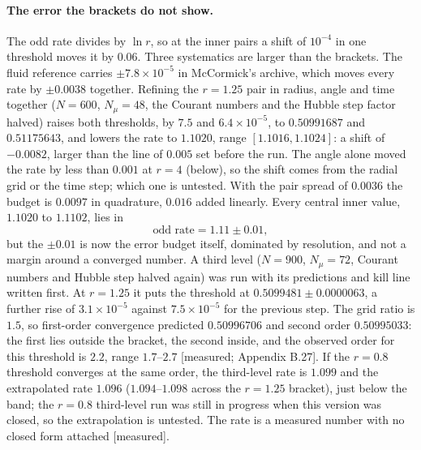 \documentclass[11pt]{article}
\newcommand{\grade}[1]{\textsf{\small[#1]}}
\begin{document}
\paragraph{The error the brackets do not show.} The odd rate divides by $\ln r$, so at the inner pairs a shift of $10^{-4}$ in one threshold moves it by $0.06$. Three systematics are larger than the brackets. The fluid reference carries $\pm7.8\times10^{-5}$ in McCormick's archive, which moves every rate by $\pm0.0038$ together. Refining the $r=1.25$ pair in radius, angle and time together ($N=600$, $N_\mu=48$, the Courant numbers and the Hubble step factor halved) raises both thresholds, by $7.5$ and $6.4\times10^{-5}$, to $0.50991687$ and $0.51175643$, and lowers the rate to $1.1020$, range $[1.1016,1.1024]$: a shift of $-0.0082$, larger than the line of $0.005$ set before the run. The angle alone moved the rate by less than $0.001$ at $r=4$ (below), so the shift comes from the radial grid or the time step; which one is untested. With the pair spread of $0.0036$ the budget is $0.0097$ in quadrature, $0.016$ added linearly. Every central inner value, $1.1020$ to $1.1102$, lies in
\begin{equation}
\text{odd rate}=1.11\pm0.01,
\end{equation}
but the $\pm0.01$ is now the error budget itself, dominated by resolution, and not a margin around a converged number. A third level ($N=900$, $N_\mu=72$, Courant numbers and Hubble step halved again) was run with its predictions and kill line written first. At $r=1.25$ it puts the threshold at $0.5099481\pm0.0000063$, a further rise of $3.1\times10^{-5}$ against $7.5\times10^{-5}$ for the previous step. The grid ratio is $1.5$, so first-order convergence predicted $0.50996706$ and second order $0.50995033$: the first lies outside the bracket, the second inside, and the observed order for this threshold is $2.2$, range $1.7$--$2.7$ \grade{measured; Appendix B.27}. If the $r=0.8$ threshold converges at the same order, the third-level rate is $1.099$ and the extrapolated rate $1.096$ ($1.094$--$1.098$ across the $r=1.25$ bracket), just below the band; the $r=0.8$ third-level run was still in progress when this version was closed, so the extrapolation is untested. The rate is a measured number with no closed form attached \grade{measured}.
\end{document}
